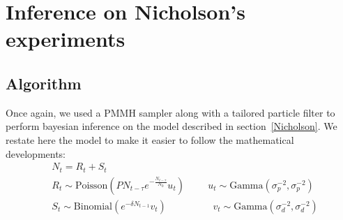 \documentclass[12pt]{article}
\begin{document}
	\section{Inference on Nicholson's experiments}
	\subsection{Algorithm}
		Once again, we used a PMMH sampler along with a tailored particle filter to perform bayesian inference on the model described in section~\ref{Nicholson}. We restate here the model to make it easier to follow the mathematical developments:
		\begin{align*}
		& N_t = R_t + S_t \\
		& R_t \sim  \mathrm{Poisson}(PN_{t-\tau}e^{-\frac{N_{t-\tau}}{N_0}}u_t)  \hspace{1cm} u_t \sim \mathrm{Gamma}(\sigma_p^{-2}, \sigma_p^{-2})\\ 
		& S_t \sim \mathrm{Binomial}(e^{-\delta N_{t-1}}v_t) \hspace{2cm}  v_t \sim \mathrm{Gamma}(\sigma_d^{-2}, \sigma_d^{-2}) 
		\end{align*}
\end{document}
